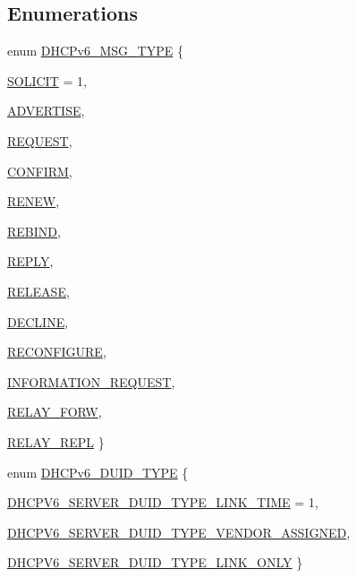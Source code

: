 \subsection*{Enumerations}
\begin{DoxyCompactItemize}
\item 
enum \hyperlink{a00483_a89b22bc5b092a112c58f8ddd7dc17936}{DHCPv6\_\-MSG\_\-TYPE} \{ \par
\hyperlink{a00483_a89b22bc5b092a112c58f8ddd7dc17936a3501dcea2be16e6bdbec01e54e03ee8b}{SOLICIT} =  1, 
\par
\hyperlink{a00483_a89b22bc5b092a112c58f8ddd7dc17936a0c0acdd86237dab3036d9df2b9c69ba1}{ADVERTISE}, 
\par
\hyperlink{a00483_a89b22bc5b092a112c58f8ddd7dc17936abaf6b8e08edf0e9d2eb38551fed1fb39}{REQUEST}, 
\par
\hyperlink{a00483_a89b22bc5b092a112c58f8ddd7dc17936a8547ec939211e497427e395b924a77f1}{CONFIRM}, 
\par
\hyperlink{a00483_a89b22bc5b092a112c58f8ddd7dc17936a103f428952ce407b3e0677c52b97a897}{RENEW}, 
\par
\hyperlink{a00483_a89b22bc5b092a112c58f8ddd7dc17936a46d3aa99fc1f60d30c4ba8c1763ab7c4}{REBIND}, 
\par
\hyperlink{a00483_a89b22bc5b092a112c58f8ddd7dc17936a6bd05ac0fc10609a9dae953dc42a7a76}{REPLY}, 
\par
\hyperlink{a00483_a89b22bc5b092a112c58f8ddd7dc17936ad590443978dc58d64aed5001f56efcdf}{RELEASE}, 
\par
\hyperlink{a00483_a89b22bc5b092a112c58f8ddd7dc17936adc20371abb33737f66685f51a3802bc8}{DECLINE}, 
\par
\hyperlink{a00483_a89b22bc5b092a112c58f8ddd7dc17936abfea36f66f9b1fbc703efc30c8250b6b}{RECONFIGURE}, 
\par
\hyperlink{a00483_a89b22bc5b092a112c58f8ddd7dc17936a9986ba77fbf8cb405125a1941162a124}{INFORMATION\_\-REQUEST}, 
\par
\hyperlink{a00483_a89b22bc5b092a112c58f8ddd7dc17936a6beb45fd93ff6d9e07c903cc828d0566}{RELAY\_\-FORW}, 
\par
\hyperlink{a00483_a89b22bc5b092a112c58f8ddd7dc17936aa15461f75e1693e1dd6bd74b7cd86ad1}{RELAY\_\-REPL}
 \}
\item 
enum \hyperlink{a00483_afdbd2a591347668dffb23033d02a22c9}{DHCPv6\_\-DUID\_\-TYPE} \{ \par
\hyperlink{a00483_afdbd2a591347668dffb23033d02a22c9a1e5a8e57f87080aa5fa02a5de0a35f2b}{DHCPV6\_\-SERVER\_\-DUID\_\-TYPE\_\-LINK\_\-TIME} =  1, 
\par
\hyperlink{a00483_afdbd2a591347668dffb23033d02a22c9a0fe511c16b1ce9631887f600398cb8d1}{DHCPV6\_\-SERVER\_\-DUID\_\-TYPE\_\-VENDOR\_\-ASSIGNED}, 
\par
\hyperlink{a00483_afdbd2a591347668dffb23033d02a22c9a1cd91a39325c6c54265f6c68b7e178cf}{DHCPV6\_\-SERVER\_\-DUID\_\-TYPE\_\-LINK\_\-ONLY}
 \}
\end{DoxyCompactItemize}
